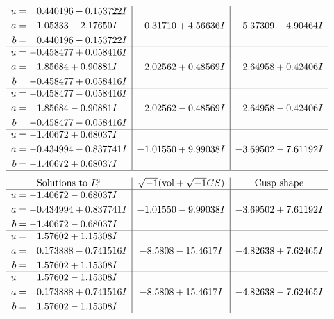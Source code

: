 \documentclass[1p]{elsarticle_modified}
\theoremstyle{definition}
\newcommand{\I}{\sqrt{-1}}
\begin{document}
$$\begin{array}{c|c|c}
\begin{aligned}
u &= \phantom{-}0.440196 - 0.153722 I \\
a &= -1.05333 - 2.17650 I \\
b &= \phantom{-}0.440196 - 0.153722 I\end{aligned}
 & \phantom{-}0.31710 + 4.56636 I & -5.37309 - 4.90464 I \\ \hline\begin{aligned}
u &= -0.458477 + 0.058416 I \\
a &= \phantom{-}1.85684 + 0.90881 I \\
b &= -0.458477 + 0.058416 I\end{aligned}
 & \phantom{-}2.02562 + 0.48569 I & \phantom{-}2.64958 + 0.42406 I \\ \hline\begin{aligned}
u &= -0.458477 - 0.058416 I \\
a &= \phantom{-}1.85684 - 0.90881 I \\
b &= -0.458477 - 0.058416 I\end{aligned}
 & \phantom{-}2.02562 - 0.48569 I & \phantom{-}2.64958 - 0.42406 I \\ \hline\begin{aligned}
u &= -1.40672 + 0.68037 I \\
a &= -0.434994 - 0.837741 I \\
b &= -1.40672 + 0.68037 I\end{aligned}
 & -1.01550 + 9.99038 I & -3.69502 - 7.61192 I\\
 \hline 
 \end{array}$$\newpage$$\begin{array}{c|c|c}  
\text{Solutions to }I^u_{1}& \I (\text{vol} + \sqrt{-1}CS) & \text{Cusp shape}\\
 \hline 
\begin{aligned}
u &= -1.40672 - 0.68037 I \\
a &= -0.434994 + 0.837741 I \\
b &= -1.40672 - 0.68037 I\end{aligned}
 & -1.01550 - 9.99038 I & -3.69502 + 7.61192 I \\ \hline\begin{aligned}
u &= \phantom{-}1.57602 + 1.15308 I \\
a &= \phantom{-}0.173888 - 0.741516 I \\
b &= \phantom{-}1.57602 + 1.15308 I\end{aligned}
 & -8.5808 - 15.4617 I & -4.82638 + 7.62465 I \\ \hline\begin{aligned}
u &= \phantom{-}1.57602 - 1.15308 I \\
a &= \phantom{-}0.173888 + 0.741516 I \\
b &= \phantom{-}1.57602 - 1.15308 I\end{aligned}
 & -8.5808 + 15.4617 I & -4.82638 - 7.62465 I\\
 \hline 
 \end{array}$$\newpage\newpage\renewcommand{\arraystretch}{1}
\end{document}
